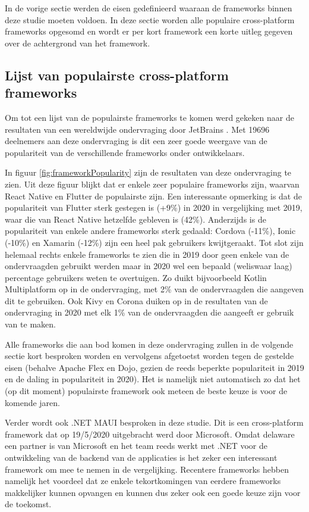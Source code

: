 In de vorige sectie werden de eisen gedefinieerd waaraan de frameworks binnen deze studie moeten voldoen. In deze sectie worden alle populaire cross-platform frameworks opgesomd en wordt er per kort framework een korte uitleg gegeven over de achtergrond van het framework.

\subsection{Lijst van populairste cross-platform frameworks}
\label{subsec:lijstPopulairsteFrameworks}

Om tot een lijst van de populairste frameworks te komen werd gekeken naar de resultaten van een wereldwijde ondervraging door JetBrains \autocite{Liu2020}. Met 19696 deelnemers aan deze ondervraging is dit een zeer goede weergave van de populariteit van de verschillende frameworks onder ontwikkelaars.

In figuur \ref{fig:frameworkPopularity} zijn de resultaten van deze ondervraging te zien. Uit deze figuur blijkt dat er enkele zeer populaire frameworks zijn, waarvan React Native en Flutter de populairste zijn. Een interessante opmerking is dat de populariteit van Flutter sterk gestegen is (+9\%) in 2020 in vergelijking met 2019, waar die van React Native hetzelfde gebleven is (42\%). Anderzijds is de populariteit van enkele andere frameworks sterk gedaald: Cordova (-11\%), Ionic (-10\%) en Xamarin (-12\%) zijn een heel pak gebruikers kwijtgeraakt. Tot slot zijn helemaal rechts enkele frameworks te zien die in 2019 door geen enkele van de ondervraagden gebruikt werden maar in 2020 wel een bepaald (weliswaar laag) percentage gebruikers weten te overtuigen. Zo duikt bijvoorbeeld Kotlin Multiplatform op in de ondervraging, met 2\% van de ondervraagden die aangeven dit te gebruiken. Ook Kivy en Corona duiken op in de resultaten van de ondervraging in 2020 met elk 1\% van de ondervraagden die aangeeft er gebruik van te maken.

Alle frameworks die aan bod komen in deze ondervraging zullen in de volgende sectie kort besproken worden en vervolgens afgetoetst worden tegen de gestelde eisen (behalve Apache Flex en Dojo, gezien de reeds beperkte populariteit in 2019 en de daling in populariteit in 2020). Het is namelijk niet automatisch zo dat het (op dit moment) populairste framework ook meteen de beste keuze is voor de komende jaren.

Verder wordt ook .NET MAUI besproken in deze studie. Dit is een cross-platform framework dat op 19/5/2020 uitgebracht werd door Microsoft. Omdat delaware een partner is van Microsoft en het team reeds werkt met .NET voor de ontwikkeling van de backend van de applicaties is het zeker een interessant framework om mee te nemen in de vergelijking. Recentere frameworks hebben namelijk het voordeel dat ze enkele tekortkomingen van eerdere frameworks makkelijker kunnen opvangen en kunnen dus zeker ook een goede keuze zijn voor de toekomst.

